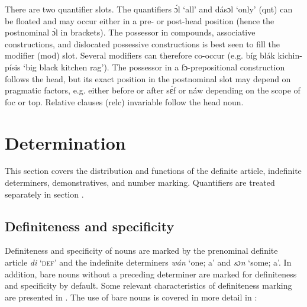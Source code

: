 There are two quantifier slots. The quantifiers ɔ́l ‘all’ and dásɔl ‘only’ (qnt) can be floated and may occur either in a pre- or post-head position (hence the postnominal ɔ́l in brackets). The possessor in compounds, associative constructions, and dislocated possessive constructions is best seen to fill the modifier (mod) slot. Several modifiers can therefore co-occur (e.g. bíg blák kichin-písis ‘big black kitchen rag’). The possessor in a fɔ-prepositional construction follows the head, but its exact position in the postnominal slot may depend on pragmatic factors, e.g. either before or after sɛ́f or náw depending on the scope of foc or top. Relative clauses (relc) invariable follow the head noun. 


\section{Determination}\label{sec:5.1}

This section covers the distribution and functions of the definite article, indefinite determiners, demonstratives, and number marking. Quantifiers are treated separately in section .

\subsection{Definiteness and specificity}

Definiteness and specificity of nouns are marked by the prenominal definite article \textit{di} ‘\textsc{def}’ and the indefinite determiners \textit{wán} ‘one; a’ and \textit{sɔn} ‘some; a’. In addition, bare nouns without a preceding determiner are marked for definiteness and specificity by default. Some relevant characteristics of definiteness marking are presented in . The use of bare nouns is covered in more detail in :


